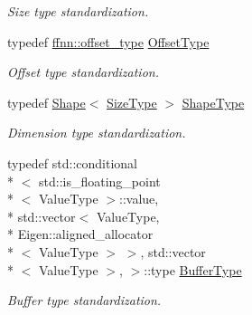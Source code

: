\begin{DoxyCompactItemize}
\begin{DoxyCompactList}\small\item\em Size type standardization. \end{DoxyCompactList}\item 
typedef \hyperlink{namespaceffnn_add5752d74b38c6e9b200f3d696fc3ec8}{ffnn\-::offset\-\_\-type} \hyperlink{classffnn_1_1layer_1_1_layer_a2130560f43788898079b7c5c01fb94c8}{Offset\-Type}
\begin{DoxyCompactList}\small\item\em Offset type standardization. \end{DoxyCompactList}\item 
typedef \hyperlink{structffnn_1_1layer_1_1_shape}{Shape}$<$ \hyperlink{classffnn_1_1layer_1_1_layer_a4c4c9782d2aed41c2a5000ec5da5601a}{Size\-Type} $>$ \hyperlink{classffnn_1_1layer_1_1_layer_ab80478345a2579402ae086a2f7de1ca2}{Shape\-Type}
\begin{DoxyCompactList}\small\item\em Dimension type standardization. \end{DoxyCompactList}\item 
typedef std\-::conditional\\*
$<$ std\-::is\-\_\-floating\-\_\-point\\*
$<$ Value\-Type $>$\-::value, \\*
std\-::vector$<$ Value\-Type, \\*
Eigen\-::aligned\-\_\-allocator\\*
$<$ Value\-Type $>$ $>$, std\-::vector\\*
$<$ Value\-Type $>$, $>$\-::type \hyperlink{classffnn_1_1layer_1_1_layer_ad9cab24dbd0cbed2febed5b635f81722}{Buffer\-Type}
\begin{DoxyCompactList}\small\item\em Buffer type standardization. \end{DoxyCompactList}\end{DoxyCompactItemize}
